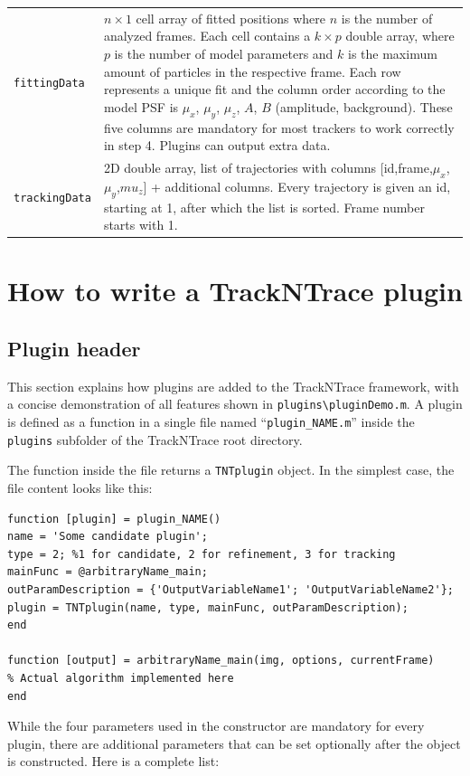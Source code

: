 \documentclass[11pt,onside]{report}
\numberwithin{equation}{chapter}
\begin{document}
\begin{table}[!h]
\begin{tabular}{p{} p{}}
\texttt{fittingData} & $n\times 1$ cell array of fitted positions where $n$ is the number of analyzed frames. Each cell contains a $k\times p$ double array, where $p$ is the number of model parameters and $k$ is the maximum amount of particles in the respective frame. Each row represents a unique fit and the column order according to the model PSF is $\mu_x$, $\mu_y$, $\mu_z$, $A$, $B$ (amplitude, background). These five columns are mandatory for most trackers to work correctly in step 4. Plugins can output extra data.\\
\texttt{trackingData} & 2D double array, list of trajectories with columns  [id,frame,$\mu_x$,$\mu_y$,$mu_z$] + additional columns. Every trajectory is given an id, starting at 1, after which the list is sorted. Frame number starts with 1.\\
\bottomrule
\end{tabular}
\end{table}

\clearpage

\section{How to write a TrackNTrace plugin}\label{sec:howto_plugins}
\subsection{Plugin header}
This section explains how plugins are added to the TrackNTrace framework, with a concise demonstration of all features shown in \texttt{plugins\textbackslash pluginDemo.m}. A plugin is defined as a function in a single file named ``\texttt{plugin\_NAME.m}'' inside the \texttt{plugins} subfolder of the TrackNTrace root directory. 

The function inside the file returns a \texttt{TNTplugin} object. In the simplest case, the file content looks like this:
\begin{lstlisting}[style=Matlab-editor]
function [plugin] = plugin_NAME()
name = 'Some candidate plugin';
type = 2; %1 for candidate, 2 for refinement, 3 for tracking
mainFunc = @arbitraryName_main;
outParamDescription = {'OutputVariableName1'; 'OutputVariableName2'};
plugin = TNTplugin(name, type, mainFunc, outParamDescription);
end

function [output] = arbitraryName_main(img, options, currentFrame) 
% Actual algorithm implemented here
end
\end{lstlisting}

While the four parameters used in the constructor are mandatory for every plugin, there are additional parameters that can be set optionally after the object is constructed. Here is a complete list:
\end{document}
